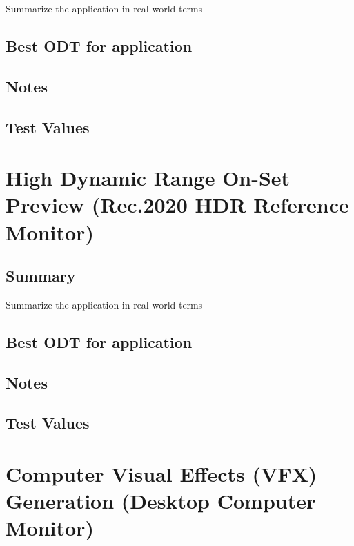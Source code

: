 Summarize the application in real world terms

\subsection{Best ODT for application}
\label{subsec:bestODT-iPad-d60}

\subsection{Notes}
\label{subsec:notes-iPad-d60}

\subsection{Test Values}
\label{subsec:testValues-iPad-d60}

\clearpage
\section{High Dynamic Range On-Set Preview (Rec.2020 HDR Reference Monitor)}
\label{sec:ot-app-rec2020hdr}

\subsection{Summary}
\label{subsec:summary-rec2020hdr}

Summarize the application in real world terms

\subsection{Best ODT for application}
\label{subsec:bestODT-rec2020hdr}

\subsection{Notes}
\label{subsec:notes-rec2020hdr}

\subsection{Test Values}
\label{subsec:testValues-rec2020hdr}

\clearpage
\section{Computer Visual Effects (VFX) Generation (Desktop Computer Monitor)}
\label{sec:ot-app-rgbMonitor}

